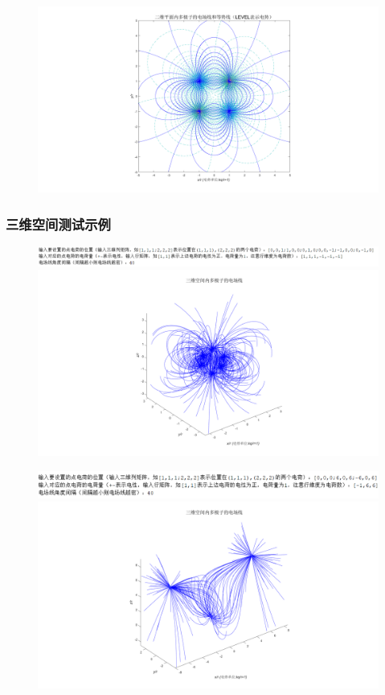 \documentclass[UTF8]{article}
\numberwithin{figure}{subsection}
\numberwithin{table}{subsection}
\begin{document}
\begin{multicols}{2}
\begin{figure}[H]
	\includegraphics[scale=0.15]{测试3.png}
	\end{figure}
	\subsubsection{三维空间测试示例}
	\begin{figure}[H]
		\centering
		\includegraphics[scale=0.4]{ceshi4.png}
	\includegraphics[scale=0.15]{测试4.png}
	\end{figure}
	\begin{figure}[H]
		\centering
		\includegraphics[scale=0.4]{ceshi5.png}
	\includegraphics[scale=0.15]{测试5.png}

\end{figure}
\end{multicols}
\end{document}

